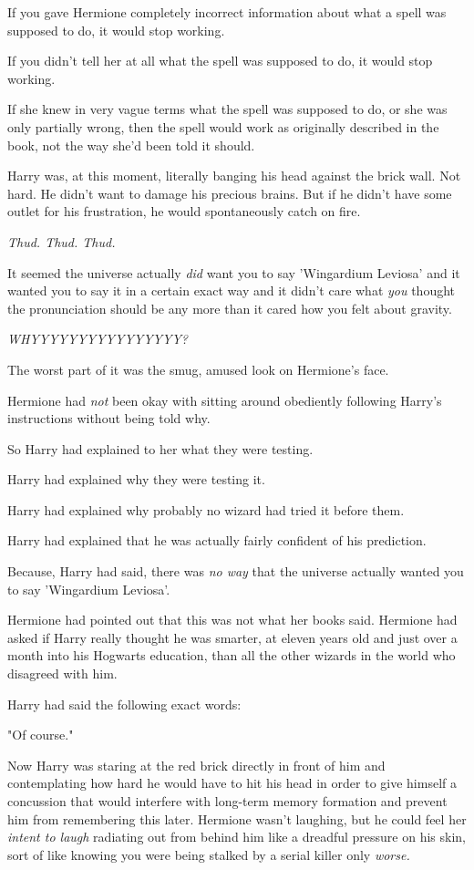 If you gave Hermione completely incorrect information about what a spell was 
supposed to do, it would stop working.

If you didn't tell her at all what the spell was supposed to do, it would stop 
working.

If she knew in very vague terms what the spell was supposed to do, or she was 
only partially wrong, then the spell would work as originally described in the 
book, not the way she'd been told it should.

Harry was, at this moment, literally banging his head against the brick wall. 
Not hard. He didn't want to damage his precious brains. But if he didn't have 
some outlet for his frustration, he would spontaneously catch on fire.

\emph{Thud. Thud. Thud.}

It seemed the universe actually \emph{did} want you to say 'Wingardium Leviosa' 
and it wanted you to say it in a certain exact way and it didn't care what 
\emph{you} thought the pronunciation should be any more than it cared how you 
felt about gravity.

\emph{WHYYYYYYYYYYYYYYYY?}

The worst part of it was the smug, amused look on Hermione's face.

Hermione had \emph{not} been okay with sitting around obediently following 
Harry's instructions without being told why.

So Harry had explained to her what they were testing.

Harry had explained why they were testing it.

Harry had explained why probably no wizard had tried it before them.

Harry had explained that he was actually fairly confident of his prediction.

Because, Harry had said, there was \emph{no way} that the universe actually 
wanted you to say 'Wingardium Leviosa'.

Hermione had pointed out that this was not what her books said. Hermione had 
asked if Harry really thought he was smarter, at eleven years old and just over 
a month into his Hogwarts education, than all the other wizards in the world 
who disagreed with him.

Harry had said the following exact words:

"Of course."

Now Harry was staring at the red brick directly in front of him and 
contemplating how hard he would have to hit his head in order to give himself a 
concussion that would interfere with long-term memory formation and prevent him 
from remembering this later. Hermione wasn't laughing, but he could feel her 
\emph{intent to laugh} radiating out from behind him like a dreadful pressure 
on his skin, sort of like knowing you were being stalked by a serial killer 
only \emph{worse.}

